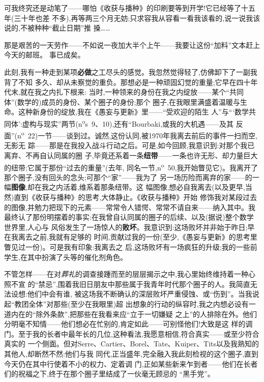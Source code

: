 可我终究还是动笔了——哪怕《收获与播种》的印刷要等到开学!它已经等了十五年(三十年也差
不多),再等两三个月无妨;只求容我从容看一看我该看的,说一说我该说的,不被种种“截止日期”推
搡……

那是艰苦的一天劳作——不如说一夜加大半个上午——我要让这份“加料”文本赶上今天的邮班。
事已成矣。

此刻,我有一种走到某项\textbf{必做}之工尽头的感觉。我忽然觉得轻了,仿佛卸下了一副我背了不知
多久、却从未察觉的重负。那想必是一种顽固幻觉的重量;它早在四十年代末,就在我之内扎下根来:
当时,一种领来的身份在我之内绽放——某个“共同体”(数学的)成员的身份、某个圈子的身份;那个
圈子,在我眼里满盛着温暖与生命。这种新身份的绽放,我在《愚妄与更新》里——“受欢迎的陌生
人”与“‘数学共同体’:虚构与现实”两节(n\textsuperscript{o}s~9、10),还有“Bourbaki,或我的大机遇——及其
反面”(n\textsuperscript{o}~22)一节——谈到过。诚然,这份认同,被1970年我离去前后的事件一扫而空,无影无
踪——那是在我投入战斗行动之后。可是,如今回顾,我意识到:对那个我已离弃、不再自认同属的圈
子,毕竟还系着一条\textbf{纽带}——一条也许无形、却力量巨大的纽带;它属于那份“过去的重量”(去年,
同名一节,n\textsuperscript{o}~50,我开始瞥见它)。我离开了那个圈子,没有回头的念头;可那个“家”\dmark{}——我为了
另一场历险而离弃的家——的一幅\textbf{图像},却在我之内活着,维系着那条纽带。这
幅图像,想必自我离去(以及更早,当然)直到《收获与播种》的思考,大体静止。《收获与播种》开始
修饰我对某段过去的图像,并勉力把现下的元素——常常令人错愕、常常不请自来——纳入其中。我
最终认了那份明摆着的事实:在我曾自认同属的圈子的后续、以及(据说)整个数学世界里,人心与
风俗发生了一场惊人的\textbf{败坏}。我意识到:这场败坏并非始于昨日;早在我离去之前,我就有足够的
时间,贡献过我的一份(至少,《愚妄与更新》的思考里瞥见过一份)。可是我有印象:我离去之
后,这场败坏有一场疯狂的升级;我的一些前学生,在其中扮演了头等的催化剂角色。

不管怎样——在对\emph{葬礼}的调查接踵而至的层层揭示之中,我心里始终维持着一种心照不宣
的“禁忌”,围着我旧日朋友中那些属于我青年时代那个圈子的人。我简直无法设想:他们中会有谁,
被这场我不断确认的深层败坏严重侵蚀、或“伤到”。当我说起“教团全体”对那些(至少在我眼里)超
出想象的行动的纵容时,我之内想必设有一道内在的“除外条款”,把那些在我看来应“立于一切嫌疑
之上”的人排除在外。他们分明毫不知情——他们想必在忙别的,肯定如此——可别怪他们!大致是这
样的调门。至于我的长者中最年长的几位,这种看法,我愿意相信,符合真实——或至少符合真实的
一个侧面。但对Serre、Cartier、Borel、Tate、Kuiper、Tits以及我熟知的其他人,却断然不然:他们与我
同代,正当盛年,完全融入我此刻检视的这个圈子,直到今天仍在其中行使着不小的权力、定着调
门,正如某些新来乍到者——他们在长者们的祝福之下,终于在那个圈子里结成了一伙毫无顾忌的
“黑手党”。


